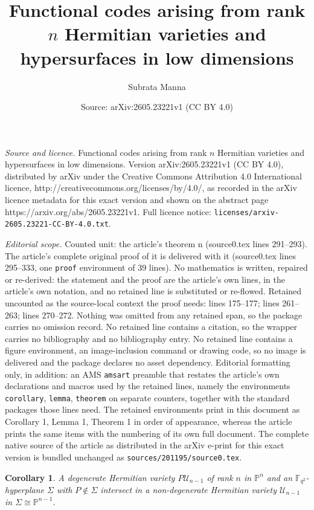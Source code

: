 \documentclass[10pt,a4paper]{amsart}
\title{Functional codes arising from rank $n$ Hermitian varieties and hypersurfaces in low dimensions}
\author{Subrata Manna}
\date{Source: arXiv:2605.23221v1 (CC BY 4.0)}
\newtheorem{corollary}{Corollary}
\newcommand{\Fqt}{\mathbb{F}_{q^2}}
\def\PP{{\mathbb P}}
\newcommand{\U}{\mathcal{U}}
\begin{document}
\maketitle

\noindent\emph{Source and licence.} Functional codes arising from rank $n$ Hermitian varieties and hypersurfaces in low dimensions. Version arXiv:2605.23221v1 (CC BY 4.0), distributed by arXiv under the Creative Commons Attribution 4.0 International licence, http://creativecommons.org/licenses/by/4.0/, as recorded in the arXiv licence metadata for this exact version and shown on the abstract page https://arxiv.org/abs/2605.23221v1. Full licence notice: \texttt{licenses/arxiv-2605.23221-CC-BY-4.0.txt}.\par\smallskip

\noindent\textit{Editorial scope.} Counted unit: the article's theorem n (source0.tex lines 291--293). The article's complete original proof of it is delivered with it (source0.tex lines 295--333, one \texttt{proof} environment of 39 lines). No mathematics is written, repaired or re-derived: the statement and the proof are the article's own lines, in the article's own notation, and no retained line is substituted or re-flowed.  Retained uncounted as the source-local context the proof needs: lines 175--177; lines 261--263; lines 270--272.  Nothing was omitted from any retained span, so the package carries no omission record.  No retained line contains a citation, so the wrapper carries no bibliography and no bibliography entry.  No retained line contains a figure environment, an image-inclusion command or drawing code, so no image is delivered and the package declares no asset dependency.  Editorial formatting only, in addition: an AMS \texttt{amsart} preamble that restates the article's own declarations and macros used by the retained lines, namely the environments \texttt{corollary}, \texttt{lemma}, \texttt{theorem} on separate counters, together with the standard packages those lines need.  The retained environments print in this document as Corollary 1, Lemma 1, Theorem 1 in order of appearance, whereas the article prints the same items with the numbering of its own full document.  The complete native source of the article as distributed in the arXiv e-print for this exact version is bundled unchanged as \texttt{sources/201195/source0.tex}.
\begin{corollary}\label{hyp cup}
      A degenerate Hermitian variety $P\U_{n-1}$ of rank $n$ in $\PP^n$ and an $\Fqt$-hyperplane $\Sigma$ with $P\notin \Sigma$ intersect in a non-degenerate Hermitian variety $\U_{n-1}$ in $\Sigma\cong \PP^{n-1}$.
\end{corollary}
\end{document}
